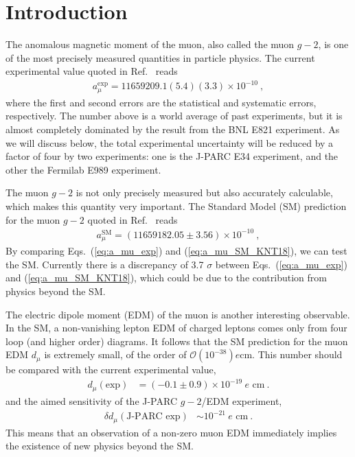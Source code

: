 \section{Introduction}

The anomalous magnetic moment of the muon, also called
the muon $g-2$, is one of the most precisely measured
quantities in particle physics.  The current experimental
value quoted in Ref.~\cite{PDG} reads
%
\begin{align}
 a_{\mu}^{\text{exp}}
= 11 659 209.1 (5.4) (3.3) \times 10^{-10} ~,
\label{eq:a_mu_exp}
\end{align}
%
where the first and second errors are the statistical and
systematic errors, respectively.  The number above is a
world average of past experiments, but it is almost completely
dominated by the result from the BNL E821 experiment.  
As we will discuss below, the total experimental uncertainty
will be reduced by a factor of four by two experiments: one is 
the J-PARC E34 experiment, and the other the Fermilab E989
experiment.

The muon $g-2$ is not only precisely measured but also accurately
calculable, which makes this quantity very important.
The Standard Model (SM) prediction for the muon $g-2$ quoted in
Ref.~\cite{KNT18} reads
%
\begin{align}
 a_{\mu}^{\text{SM}}
= (11 659 182.05 \pm 3.56) \times 10^{-10} ~,
\label{eq:a_mu_SM_KNT18}
\end{align}
%
By comparing Eqs.~(\ref{eq:a_mu_exp}) and (\ref{eq:a_mu_SM_KNT18}),
we can test the SM.  Currently there is a discrepancy of 
3.7 $\sigma$ between Eqs.~(\ref{eq:a_mu_exp}) and (\ref{eq:a_mu_SM_KNT18}), 
which could be due to the contribution from physics beyond the SM. 

The electric dipole moment (EDM) of the muon is another interesting
observable.  In the SM, a non-vanishing lepton EDM of charged leptons
comes only from four loop (and higher order) diagrams.  It follows
that the SM prediction for the muon EDM $d_\mu$ is extremely small,
of the order of ${\mathcal O}(10^{-38}) e \text{cm}$.
This number should be compared with the current experimental
value,
%
\begin{align}
 d_\mu(\text{exp}) &= (-0.1 \pm 0.9) \times 10^{-19} \ e \text{ cm} ~.
\end{align}
%
and the aimed sensitivity of the J-PARC $g-2$/EDM experiment,
%
\begin{align}
 \delta d_\mu(\text{J-PARC exp}) &\sim  10^{-21} \ e \text{ cm} ~.
\end{align}
%
This means that an observation of a non-zero muon EDM immediately
implies the existence of new physics beyond the SM.  

